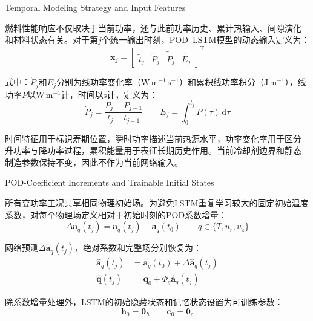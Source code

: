 {Temporal Modeling Strategy and Input Features}

燃料性能响应不仅取决于当前功率，还与此前功率历史、累计热输入、间隙演化
和材料状态有关。对于第$j$个统一输出时刻，POD--LSTM模型的动态输入定义为：
\begin{equation}
	\boldsymbol x_j
	=
	\begin{bmatrix}
		\widetilde t_j &
		\widetilde P_j &
		\widetilde{\dot P}_j &
		\widetilde E_j
	\end{bmatrix}^{\mathrm T}
	\label{eq:formal_lstm_features}
\end{equation}

\noindent 式中：$\dot P_j$和$E_j$分别为线功率变化率（$\mathrm{W\,m^{-1}\,s^{-1}}$）和累积线功率积分（$\mathrm{J\,m^{-1}}$），线功率$P$以$\mathrm{W\,m^{-1}}$计，时间以$\mathrm{s}$计，定义为：
\begin{equation}
	\dot P_j
	=
	\frac{P_j-P_{j-1}}{t_j-t_{j-1}}
	\qquad
	E_j
	=
	\int_0^{t_j}P(\tau)\,\mathrm d\tau
	\label{eq:formal_power_derivative_energy}
\end{equation}

时间特征用于标识寿期位置，瞬时功率描述当前热源水平，功率变化率用于区分
升功率与降功率过程，累积能量用于表征长期历史作用。当前冷却剂边界和静态
制造参数保持不变，因此不作为当前网络输入。

{POD-Coefficient Increments and Trainable Initial States}

所有变功率工况共享相同物理初始场。为避免LSTM重复学习较大的固定初始温度
系数，对每个物理场定义相对于初始时刻的POD系数增量：
\begin{equation}
	\Delta\boldsymbol a_q(t_j)
	=
	\boldsymbol a_q(t_j)-\boldsymbol a_q(t_0)
	\qquad
	q\in\{T,u_r,u_z\}
	\label{eq:formal_coefficient_increment}
\end{equation}

网络预测$\Delta\widehat{\boldsymbol a}_q(t_j)$，绝对系数和完整场分别恢复为：
\begin{align}
	\widehat{\boldsymbol a}_q(t_j)
	&=
	\boldsymbol a_q(t_0)
	+
	\Delta\widehat{\boldsymbol a}_q(t_j)
	\label{eq:formal_restore_coefficients}\\
	\widehat{\boldsymbol q}(t_j)
	&=
	\boldsymbol q_0
	+
	\boldsymbol\varPhi_q
	\widehat{\boldsymbol a}_q(t_j)
	\label{eq:formal_restore_field}
\end{align}

除系数增量处理外，LSTM的初始隐藏状态和记忆状态设置为可训练参数：
\begin{equation}
	\boldsymbol h_0=\boldsymbol\theta_h
	\qquad
	\boldsymbol c_0=\boldsymbol\theta_c
	\label{eq:trainable_lstm_initial_states}
\end{equation}

